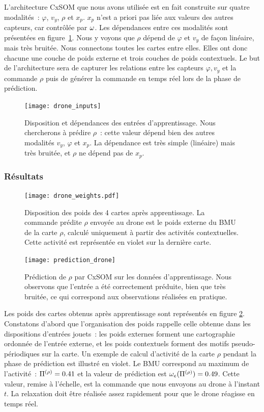 \documentclass[../main]{subfiles}
\begin{document}
L'architecture CxSOM que nous avons utilisée est en fait construite sur quatre modalités~: $\varphi$, $v_y$, $\rho$ et $x_p$.
$x_p$ n'est a priori pas liée aux valeurs des autres capteurs, car contrôlée par $\omega$.
Les dépendances entre ces modalités sont présentées en figure~\ref{fig:drone_inp}. Nous y voyons que $\rho$ dépend de $\varphi$ et $v_y$ de façon linéaire, mais très bruitée.
Nous connectons toutes les cartes entre elles.
 Elles ont donc chacune une couche de poids externe et trois couches de poids contextuels. Le but de l'architecture sera de capturer les relations entre les capteurs $\varphi, v_y$ et la commande $\rho$ puis de générer la commande en temps réel lors de la phase de prédiction. 

\begin{figure}
	\centering\texttt{[image: drone\_inputs]}
	\caption{Disposition et dépendances des entrées d'apprentissage. Nous chercherons à prédire $\rho$~: cette valeur dépend bien des autres modalités $v_y$, $\varphi$ et $x_p$. La dépendance est très simple (linéaire) mais très bruitée, et $\rho$ ne dépend pas de $x_p$. \label{fig:drone_inp}}
\end{figure}

\subsubsection{Résultats}
\begin{figure}
	\texttt{[image: drone\_weights.pdf]}
	\caption{Disposition des poids des 4 cartes après apprentissage. La commande prédite $\rho$ envoyée au drone est le poids externe du BMU de la carte $\rho$, calculé uniquement à partir des activités contextuelles. Cette activité est représentée en violet sur la dernière carte.}
	\label{fig:drone_w}
	\end{figure}

	\begin{figure}
		\centering\texttt{[image: prediction\_drone]}
		\caption{Prédiction de $\rho$ par CxSOM sur les données d'apprentissage. Nous observons que l'entrée a été correctement préduite, bien que très bruitée, ce qui correspond aux observations réalisées en pratique. \label{fig:pred_drone}}
	\end{figure}

Les poids des cartes obtenus après apprentissage sont représentés en figure \ref{fig:drone_w}. 
Constatons d'abord que l'organisation des poids rappelle celle obtenue dans les dispositions d'entrées jouets~: les poids externes forment une cartographie ordonnée de l'entrée externe, et les poids contextuels forment des motifs pseudo-périodiques sur la carte. 
Un exemple de calcul d'activité de la carte $\rho$ pendant la phase de prédiction est illustré en violet. Le BMU correspond au maximum de l'activité~: $\Pi^{({\rho})} = 0.41$ et la valeur de prédiction est $\omega_e(\Pi^{({\rho})}) = 0.49$. Cette valeur, remise à l'échelle, est la commande que nous envoyons au drone à l'instant $t$.
La relaxation doit être réalisée assez rapidement pour que le drone réagisse en temps réel.
\end{document}
